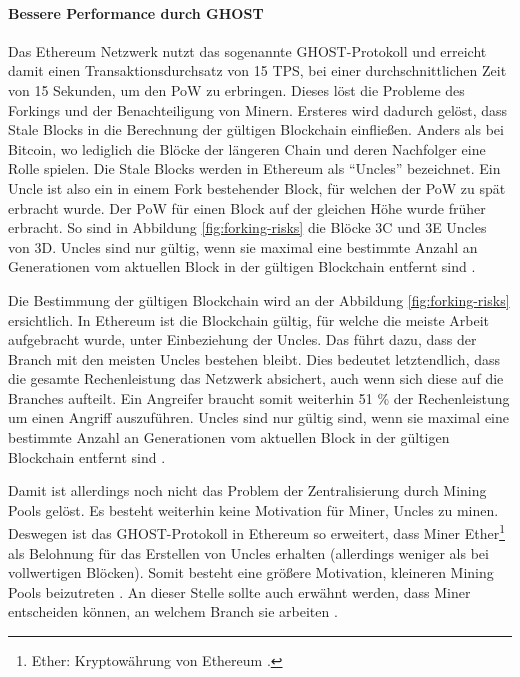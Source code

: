 \paragraph{Bessere Performance durch GHOST}
Das Ethereum Netzwerk nutzt das sogenannte \acs{GHOST}-Protokoll und erreicht damit einen Transaktionsdurchsatz von 15 \acs{TPS}, bei einer durchschnittlichen Zeit von 15 Sekunden, um den \acs{PoW} zu erbringen. Dieses löst die Probleme des Forkings und der Benachteiligung von Minern. Ersteres wird dadurch gelöst, dass Stale Blocks in die Berechnung der gültigen Blockchain einfließen. Anders als bei Bitcoin, wo lediglich die Blöcke der längeren Chain und deren Nachfolger eine Rolle spielen. Die Stale Blocks werden in Ethereum als ``Uncles'' bezeichnet. Ein Uncle ist also ein in einem Fork bestehender Block, für welchen der \acs{PoW} zu spät erbracht wurde. Der \acs{PoW} für einen Block auf der gleichen Höhe wurde früher erbracht. So sind in Abbildung \ref{fig:forking-risks} die Blöcke 3C und 3E Uncles von 3D. Uncles sind nur gültig, wenn sie maximal eine bestimmte Anzahl an Generationen vom aktuellen Block in der gültigen Blockchain entfernt sind \cite{EthereumTeamEthereumWhitePaper2017}.

Die Bestimmung der gültigen Blockchain wird an der Abbildung \ref{fig:forking-risks} ersichtlich. In Ethereum ist die Blockchain gültig, für welche die meiste Arbeit aufgebracht wurde, unter Einbeziehung der Uncles. Das führt dazu, dass der Branch mit den meisten Uncles bestehen bleibt. Dies bedeutet letztendlich, dass die gesamte Rechenleistung das Netzwerk absichert, auch wenn sich diese auf die Branches aufteilt. Ein Angreifer braucht somit weiterhin 51 \% der Rechenleistung um einen Angriff auszuführen. Uncles sind nur gültig sind, wenn sie maximal eine bestimmte Anzahl an Generationen vom aktuellen Block in der gültigen Blockchain entfernt sind \cite{EthereumTeamEthereumWhitePaper2017} \cite{SompolinskyAcceleratingBitcoinTransaction2013}.

Damit ist allerdings noch nicht das Problem der Zentralisierung durch Mining Pools gelöst. Es besteht weiterhin keine Motivation für Miner, Uncles zu minen. Deswegen ist das \acs{GHOST}-Protokoll in Ethereum so erweitert, dass Miner Ether\footnote{Ether: Kryptowährung von Ethereum \cite{EthereumTeamEthereumWhitePaper2017}.} als Belohnung für das Erstellen von Uncles erhalten (allerdings weniger als bei vollwertigen Blöcken). Somit besteht eine größere Motivation, kleineren Mining Pools beizutreten \cite{EthereumTeamEthereumWhitePaper2017}. An dieser Stelle sollte auch erwähnt werden, dass Miner entscheiden können, an welchem Branch sie arbeiten \cite{ZhengBlockchainChallengesOpportunities2017}. 


